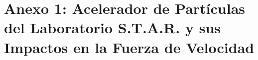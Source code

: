 %
\section{Anexo 1: Acelerador de Partículas del Laboratorio S.T.A.R. y sus Impactos en la Fuerza de Velocidad}
\Blindtext